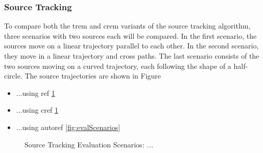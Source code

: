 \subsubsection{Source Tracking}
To compare both the \gls{trem} and \gls{crem} variants of the source tracking algorithm, three scenarios with two sources each will be compared. In the first scenario, the sources move on a linear trajectory parallel to each other. In the second scenario, they move in a linear trajectory and cross paths. The last scenario consists of the two sources moving on a curved trajectory, each following the shape of a half-circle. The source trajectories are shown in Figure
\begin{itemize}
    \item ...using ref \ref{fig:evalScenarios}
    \item ...using cref \cref{fig:evalScenarios}
    \item ...using autoref \autoref{fig:evalScenarios}
\end{itemize}

\begin{figure}[!htb]
\label{fig:evalScenarios}
    \setlength\figureheight{4cm}
    \setlength\figurewidth{\textwidth}
    
    \caption[Source Tracking Evaluation Scenarios]{Source Tracking Evaluation Scenarios: \itshape ...}
\end{figure}


